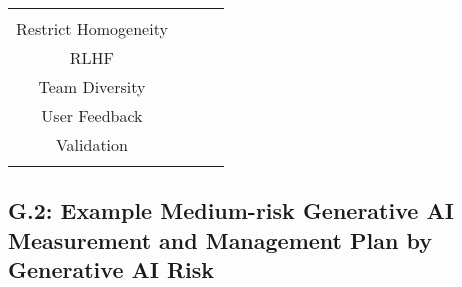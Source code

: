 \documentclass[fleqn]{article}
\begin{document}
\begin{landscape}
\begin{table}[H]
\begin{tabular}{|c|c|c|c|}
{			\textbullet\hspace{3pt} Refresh\\ 
			\textbullet\hspace{3pt} Restrict Homogeneity\\ 					
			\textbullet\hspace{3pt} RLHF\\ 
			\textbullet\hspace{3pt} Team Diversity\\ 	
			\textbullet\hspace{3pt} User Feedback\\ 	
			\textbullet\hspace{3pt} Validation\\ 					 	 
		}
		\\
		\hline
	\end{tabular}
	\label{table:med_risk_plan_by_tc_cont}
\end{table}

\vfill
\raisebox{-10pt}{\makebox[\linewidth]{\thepage}}

\pagebreak
\thispagestyle{empty}

\subsection*{G.2: Example Medium-risk Generative AI Measurement and Management Plan by Generative AI Risk}\label{appdxg2}


\end{landscape}
\end{document}
